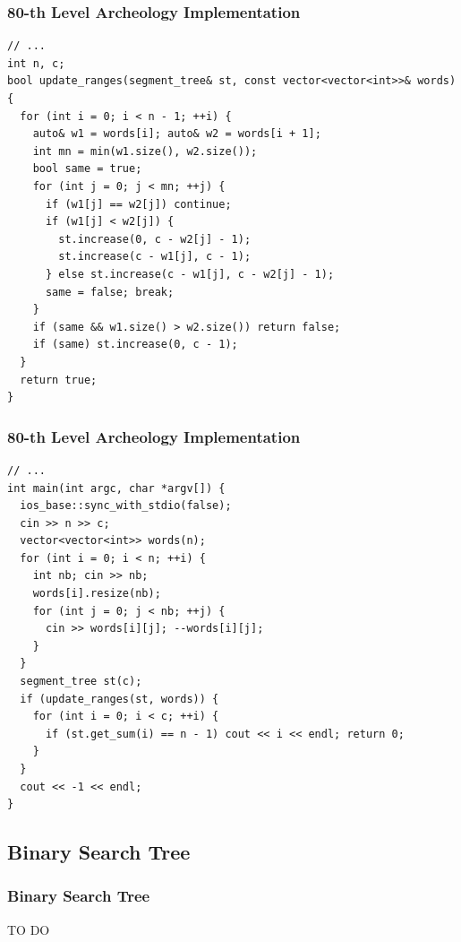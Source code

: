 \documentclass{beamer}
\begin{document}
\begin{frame}[containsverbatim]
\frametitle{80-th Level Archeology Implementation}

\scriptsize

\begin{lstlisting}[mathescape]
// ...
int n, c;
bool update_ranges(segment_tree& st, const vector<vector<int>>& words) {
  for (int i = 0; i < n - 1; ++i) {
    auto& w1 = words[i]; auto& w2 = words[i + 1];
    int mn = min(w1.size(), w2.size());
    bool same = true;
    for (int j = 0; j < mn; ++j) {
      if (w1[j] == w2[j]) continue;
      if (w1[j] < w2[j]) {
        st.increase(0, c - w2[j] - 1);
        st.increase(c - w1[j], c - 1);
      } else st.increase(c - w1[j], c - w2[j] - 1);
      same = false; break;
    }
    if (same && w1.size() > w2.size()) return false;
    if (same) st.increase(0, c - 1);
  }
  return true;
}
\end{lstlisting}

\end{frame}

\begin{frame}[containsverbatim]
\frametitle{80-th Level Archeology Implementation}

\scriptsize

\begin{lstlisting}[mathescape]
// ...
int main(int argc, char *argv[]) {
  ios_base::sync_with_stdio(false);
  cin >> n >> c;
  vector<vector<int>> words(n);
  for (int i = 0; i < n; ++i) {
    int nb; cin >> nb;
    words[i].resize(nb);
    for (int j = 0; j < nb; ++j) {
      cin >> words[i][j]; --words[i][j];
    }
  }
  segment_tree st(c);
  if (update_ranges(st, words)) {
    for (int i = 0; i < c; ++i) {
      if (st.get_sum(i) == n - 1) cout << i << endl; return 0;
    }
  }
  cout << -1 << endl;
}
\end{lstlisting}

\end{frame}

\fi


\subsection{Binary Search Tree}

\begin{frame}%
\frametitle{Binary Search Tree}

TO DO

\end{frame}
\end{document}
